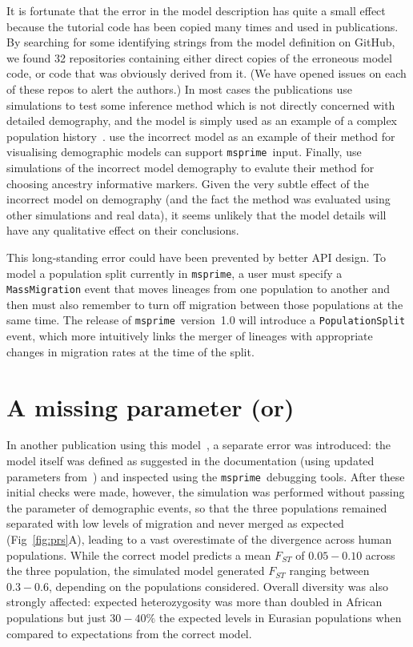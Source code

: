 \documentclass{article}
\newcommand{\msprime}[0]{\texttt{msprime}}
\begin{document}
It is fortunate that the error in the model description has quite a
small effect because the tutorial code has been copied many times
and used in publications. By searching for some identifying strings
from the model definition on GitHub,
we found 32 repositories containing either direct copies of the
erroneous model code, or code that was obviously derived from it.
(We have opened issues on each of these repos to alert the authors.)
In most cases the publications use simulations to test some inference
method which is not directly concerned with detailed demography,
and the model is simply used as an example of a complex population
history~\citep{kelleher2019inferring,albers2020dating,tong2020population}.
\cite{zhou2018popdemog} use the incorrect model as an example
of their method for visualising demographic models can support
\msprime\ input.
Finally, \cite{pfaffelhuber2020choose}
use simulations of the incorrect model demography to evalute
their method for choosing ancestry informative markers.
Given the very subtle effect of the incorrect
model on demography (and the fact the method was evaluated using other
simulations and real data), it seems unlikely that the model details
will have any qualitative effect on their conclusions.

This long-standing error could have been prevented by better API design.
To model a population split currently in \msprime, a user must specify a
\texttt{MassMigration} event that moves lineages from one population to another
and then must also remember to turn off migration
between those populations at the same time.
The release of \msprime\ version~1.0 will introduce a \texttt{PopulationSplit} event,
which more intuitively links the merger of lineages with appropriate changes in
migration rates at the time of the split.

\section{A missing parameter (or) }

In another publication using this model~\citep{martin2017human},
a separate error was introduced: the model itself was defined as suggested
in the documentation (using updated parameters
from~\citet{gravel2011demographic}) and inspected
using the \msprime\ debugging tools.
After these initial checks were made, however, the simulation
was performed without passing the parameter of demographic events,
so that the three populations remained separated with low levels of migration and
never merged as expected (Fig~\ref{fig:prs}A),
leading to a vast overestimate of the divergence across human populations.
While the correct model predicts a mean $F_{ST}$ of
$0.05 - 0.10$ across the three population, the simulated model generated $F_{ST}$
ranging between $0.3 - 0.6$, depending on the populations considered.
Overall diversity was also strongly affected: expected heterozygosity was more than
doubled in African populations but just $30-40\%$ the expected
levels in Eurasian populations when compared to expectations from the correct model.
\end{document}
